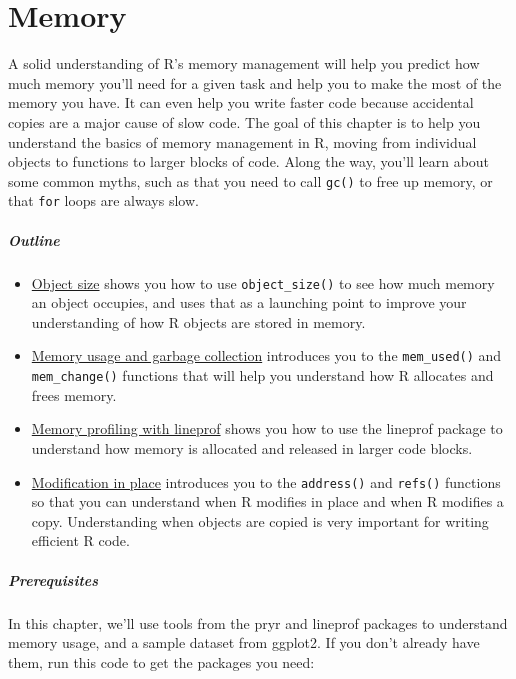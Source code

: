\chapter{Memory}\label{memory}

A solid understanding of R's memory management will help you predict how
much memory you'll need for a given task and help you to make the most
of the memory you have. It can even help you write faster code because
accidental copies are a major cause of slow code. The goal of this
chapter is to help you understand the basics of memory management in R,
moving from individual objects to functions to larger blocks of code.
Along the way, you'll learn about some common myths, such as that you
need to call \texttt{gc()} to free up memory, or that \texttt{for} loops
are always slow. 

\paragraph{Outline}

\begin{itemize}
\item
  \hyperref[object-size]{Object size} shows you how to use
  \texttt{object\_size()} to see how much memory an object occupies, and
  uses that as a launching point to improve your understanding of how R
  objects are stored in memory.
\item
  \hyperref[gc]{Memory usage and garbage collection} introduces you to
  the \texttt{mem\_used()} and \texttt{mem\_change()} functions that
  will help you understand how R allocates and frees memory.
\item
  \hyperref[memory-profiling]{Memory profiling with lineprof} shows you
  how to use the lineprof package to understand how memory is allocated
  and released in larger code blocks.
\item
  \hyperref[modification]{Modification in place} introduces you to the
  \texttt{address()} and \texttt{refs()} functions so that you can
  understand when R modifies in place and when R modifies a copy.
  Understanding when objects are copied is very important for writing
  efficient R code.
\end{itemize}

\paragraph{Prerequisites}

In this chapter, we'll use tools from the pryr and lineprof packages to
understand memory usage, and a sample dataset from ggplot2. If you don't
already have them, run this code to get the packages you need:

